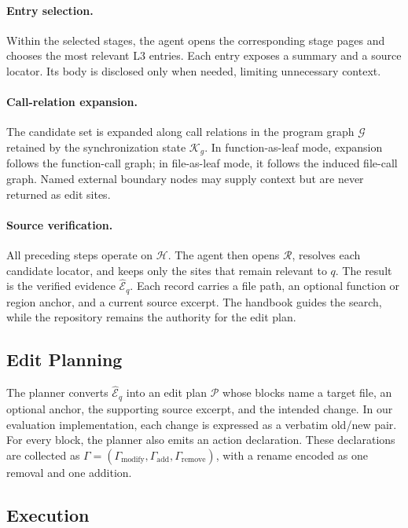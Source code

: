 \documentclass[]{ailab}
\newcommand{\hbsmall}{\textsf{function-as-leaf}}
\newcommand{\hblarge}{\textsf{file-as-leaf}}
\begin{document}
\paragraph{Entry selection.}
Within the selected stages, the agent opens the corresponding stage pages and
chooses the most relevant L3 entries. Each entry exposes a summary and a source
locator. Its body is disclosed only when needed, limiting unnecessary context.

\paragraph{Call-relation expansion.}
The candidate set is expanded along call relations in the program graph
$\mathcal{G}$ retained by the synchronization state $\mathcal{K}_g$. In
\hbsmall{} mode, expansion follows the function-call graph; in \hblarge{} mode,
it follows the induced file-call graph. Named external boundary nodes may supply
context but are never returned as edit sites.

\paragraph{Source verification.}
All preceding steps operate on $\mathcal{H}$. The agent then opens
$\mathcal{R}$, resolves each candidate locator, and keeps only the sites that
remain relevant to $q$. The result is the verified evidence
$\widehat{\mathcal{E}}_q$. Each record carries a file path, an optional function
or region anchor, and a current source excerpt. The handbook guides the search,
while the repository remains the authority for the edit plan.

\subsection{Edit Planning}

The planner converts $\widehat{\mathcal{E}}_q$ into an edit plan $\mathcal{P}$
whose blocks name a target file, an optional anchor, the supporting source
excerpt, and the intended change. In our evaluation implementation, each change
is expressed as a verbatim old/new pair. For every block, the planner also emits
an action declaration. These declarations are collected as
$\Gamma=(\Gamma_{\mathrm{modify}},\Gamma_{\mathrm{add}},
\Gamma_{\mathrm{remove}})$, with a rename encoded as one removal and one
addition.

\subsection{Execution}
\end{document}
